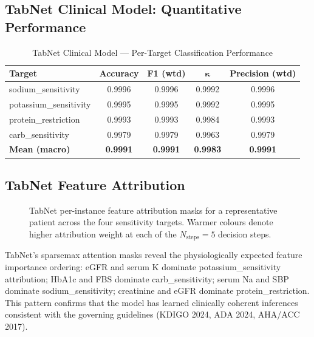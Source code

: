 \documentclass[journal]{IEEEtran}
\begin{document}
\subsection{TabNet Clinical Model: Quantitative Performance}

\begin{table}[!t]
\centering
\caption{TabNet Clinical Model — Per-Target Classification Performance}
\begin{tabular}{lcccc}
\hline
\textbf{Target} & \textbf{Accuracy} & \textbf{F1 (wtd)} & $\boldsymbol{\kappa}$ & \textbf{Precision (wtd)} \\
\hline
sodium\_sensitivity   & 0.9996 & 0.9996 & 0.9992 & 0.9996 \\
potassium\_sensitivity & 0.9995 & 0.9995 & 0.9992 & 0.9995 \\
protein\_restriction   & 0.9993 & 0.9993 & 0.9984 & 0.9993 \\
carb\_sensitivity      & 0.9979 & 0.9979 & 0.9963 & 0.9979 \\
\hline
\textbf{Mean (macro)} & \textbf{0.9991} & \textbf{0.9991} & \textbf{0.9983} & \textbf{0.9991} \\
\hline
\end{tabular}
\end{table}

\subsection{TabNet Feature Attribution}

\begin{figure}[!t]
    \centering
    \caption{TabNet per-instance feature attribution masks for a
    representative patient across the four sensitivity targets.
    Warmer colours denote higher attribution weight at each of the
    $N_{\text{steps}}=5$ decision steps.}
    \label{fig:tabnet_attribution}
\end{figure}

TabNet's sparsemax attention masks reveal the physiologically
expected feature importance ordering: eGFR and serum K dominate
potassium\_sensitivity attribution; HbA1c and FBS dominate
carb\_sensitivity; serum Na and SBP dominate sodium\_sensitivity;
creatinine and eGFR dominate protein\_restriction. This pattern confirms
that the model has learned clinically coherent inferences consistent with
the governing guidelines (KDIGO 2024, ADA 2024, AHA/ACC 2017).
\end{document}
